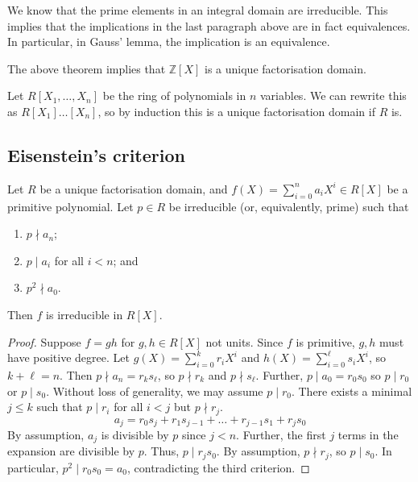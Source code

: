 \begin{remark}
	We know that the prime elements in an integral domain are irreducible.
	This implies that the implications in the last paragraph above are in fact equivalences.
	In particular, in Gauss' lemma, the implication is an equivalence.
\end{remark}
\begin{example}
	The above theorem implies that \( \mathbb Z[X] \) is a unique factorisation domain.

	Let \( R[X_1, \dots, X_n] \) be the ring of polynomials in \( n \) variables.
	We can rewrite this as \( R[X_1]\dots[X_n] \), so by induction this is a unique factorisation domain if \( R \) is.
\end{example}

\subsection{Eisenstein's criterion}
\begin{proposition}
	Let \( R \) be a unique factorisation domain, and \( f(X) = \sum_{i=0}^n a_i X^i \in R[X] \) be a primitive polynomial.
	Let \( p \in R \) be irreducible (or, equivalently, prime) such that
	\begin{enumerate}
		\item \( p \nmid a_n \);
		\item \( p \mid a_i \) for all \( i < n \); and
		\item \( p^2 \nmid a_0 \).
	\end{enumerate}
	Then \( f \) is irreducible in \( R[X] \).
\end{proposition}
\begin{proof}
	Suppose \( f = gh \) for \( g,h \in R[X] \) not units.
	Since \( f \) is primitive, \( g, h \) must have positive degree.
	Let \( g(X) = \sum_{i=0}^k r_i X^i \) and \( h(X) = \sum_{i=0}^\ell s_i X^i \), so \( k + \ell = n \).
	Then \( p \nmid a_n = r_k s_\ell \), so \( p \nmid r_k \) and \( p \nmid s_\ell \).
	Further, \( p \mid a_0 = r_0 s_0 \) so \( p \mid r_0 \) or \( p \mid s_0 \).
	Without loss of generality, we may assume \( p \mid r_0 \).
	There exists a minimal \( j \leq k \) such that \( p \mid r_i \) for all \( i < j \) but \( p \nmid r_j \).
	\[
		a_j = r_0 s_j + r_1 s_{j-1} + \dots + r_{j-1} s_1 + r_j s_0
	\]
	By assumption, \( a_j \) is divisible by \( p \) since \( j < n \).
	Further, the first \( j \) terms in the expansion are divisible by \( p \).
	Thus, \( p \mid r_j s_0 \).
	By assumption, \( p \nmid r_j \), so \( p \mid s_0 \).
	In particular, \( p^2 \mid r_0 s_0 = a_0 \), contradicting the third criterion.
\end{proof}
